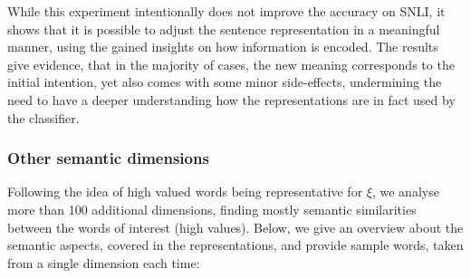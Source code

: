 \noindent
While this experiment intentionally does not improve the accuracy on \ac{SNLI}, it shows that it is possible to adjust the sentence representation in a meaningful manner, using the gained insights on how information is encoded. The results give evidence, that in the majority of cases, the new meaning corresponds to the initial intention, yet also comes with some minor side-effects, undermining the need to have a deeper understanding how the representations are in fact used by the classifier. 
\subsubsection{Other semantic dimensions}
Following the idea of high valued words being representative for $\xi$, we analyse more than 100 additional dimensions, finding mostly semantic similarities between the words of interest (high values). Below, we give an overview about the semantic aspects, covered in the representations, and provide sample words, taken from a single dimension each time:
